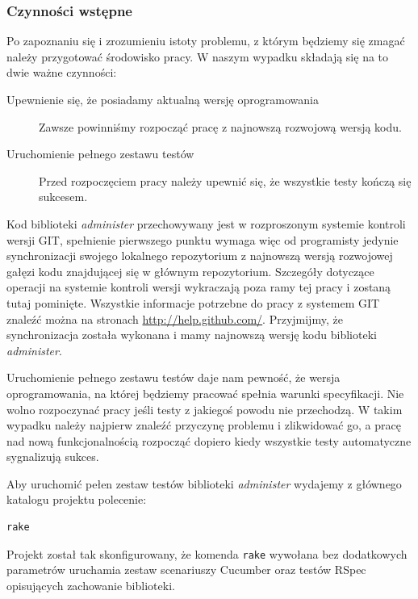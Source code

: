   	\subsubsection{Czynności wstępne}
  	
  	Po zapoznaniu się i zrozumieniu istoty problemu, z którym będziemy się zmagać należy przygotować środowisko pracy. W naszym wypadku składają się na to dwie ważne czynności:
  	
  	 \begin{description}
        \item[Upewnienie się, że posiadamy aktualną wersję oprogramowania] Zawsze powinniśmy rozpocząć pracę z najnowszą rozwojową wersją kodu.
        \item[Uruchomienie pełnego zestawu testów] Przed rozpoczęciem pracy należy upewnić się, że wszystkie testy kończą się sukcesem.
      \end{description}
      
    Kod biblioteki \emph{administer} przechowywany jest w rozproszonym systemie kontroli wersji GIT, spełnienie pierwszego punktu wymaga więc od programisty jedynie synchronizacji swojego lokalnego repozytorium z najnowszą wersją rozwojowej gałęzi kodu znajdującej się w głównym repozytorium. Szczegóły dotyczące operacji na systemie kontroli wersji wykraczają poza ramy tej pracy i zostaną tutaj pominięte. Wszystkie informacje potrzebne do pracy z systemem GIT znaleźć można na stronach \url{http://help.github.com/}. Przyjmijmy, że synchronizacja została wykonana i mamy najnowszą wersję kodu biblioteki \emph{administer}. 
    
    Uruchomienie pełnego zestawu testów daje nam pewność, że wersja oprogramowania, na której będziemy pracować spełnia warunki specyfikacji. Nie wolno rozpoczynać pracy jeśli testy z jakiegoś powodu nie przechodzą. W takim wypadku należy najpierw znaleźć przyczynę problemu i zlikwidować go, a pracę nad nową funkcjonalnością rozpocząć dopiero kiedy wszystkie testy automatyczne sygnalizują sukces.
    
    Aby uruchomić pełen zestaw testów biblioteki \emph{administer} wydajemy z głównego katalogu projektu polecenie:
    
\begin{lstlisting}
rake
\end{lstlisting}
    
    Projekt został tak skonfigurowany, że komenda \texttt{rake} wywołana bez dodatkowych parametrów uruchamia zestaw scenariuszy Cucumber oraz testów RSpec opisujących zachowanie biblioteki. 
    
